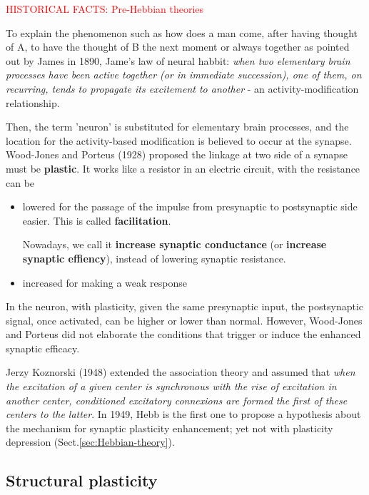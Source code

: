 \begin{mdframed}
\textcolor{red}{HISTORICAL FACTS: Pre-Hebbian theories}

To explain the phenomenon such as how does a man come, after having thought of
A, to have the thought of B the next moment or always together as pointed out by
James in 1890, Jame's law of neural habbit: {\it when two elementary brain
processes have been active together (or in immediate succession), one of them,
on recurring, tends to propagate its excitement to another} - an
activity-modification relationship.

Then, the term 'neuron' is substituted for elementary brain processes, and the
location for the activity-based modification is believed to occur at the
synapse. Wood-Jones and Porteus (1928) proposed the linkage at two side of a
synapse must be {\bf plastic}. It works like a resistor in an electric circuit,
with the resistance can be
\begin{itemize}
  \item lowered for the passage of the impulse from presynaptic to postsynaptic
  side easier. This is called {\bf facilitation}.

Nowadays, we call it {\bf increase synaptic conductance} (or {\bf increase
synaptic effiency}), instead of lowering synaptic resistance.
  
  \item increased for making a weak response
  
\end{itemize}
In the neuron, with plasticity, given the same presynaptic input, the
postsynaptic signal, once activated, can be higher or lower than normal.
However, Wood-Jones and Porteus did not elaborate the conditions that trigger or
induce the enhanced synaptic efficacy. 

Jerzy Koznorski (1948) extended the association theory and assumed that {\it
when the excitation of a given center is synchronous with the rise of excitation
in another center, conditioned excitatory connexions are formed the first of
these centers to the latter}. In 1949, Hebb is the first one to propose a
hypothesis about the mechanism for synaptic plasticity enhancement; yet not
with plasticity depression (Sect.\ref{sec:Hebbian-theory}).


\end{mdframed}
\subsection{Structural plasticity}
\label{sec:structural-plasticity}
\label{sec:plasticity-structural}

